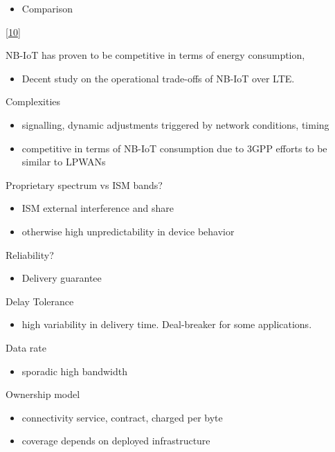 \documentclass[]{article}
\providecommand{\tightlist}{%
  \setlength{\itemsep}{0pt}\setlength{\parskip}{0pt}}
\begin{document}
\begin{itemize}
\tightlist
\item
  Comparison
\end{itemize}

{[}\protect\hyperlink{ref-Martinez2019}{10}{]}

NB-IoT has proven to be competitive in terms of energy consumption,

\begin{itemize}
\tightlist
\item
  Decent study on the operational trade-offs of NB-IoT over LTE.
\end{itemize}

Complexities

\begin{itemize}
\tightlist
\item
  signalling, dynamic adjustments triggered by network conditions,
  timing
\item
  competitive in terms of NB-IoT consumption due to 3GPP efforts to be
  similar to LPWANs
\end{itemize}

Proprietary spectrum vs ISM bands?

\begin{itemize}
\tightlist
\item
  ISM external interference and share
\item
  otherwise high unpredictability in device behavior
\end{itemize}

Reliability?

\begin{itemize}
\tightlist
\item
  Delivery guarantee
\end{itemize}

Delay Tolerance

\begin{itemize}
\tightlist
\item
  high variability in delivery time. Deal-breaker for some applications.
\end{itemize}

Data rate

\begin{itemize}
\tightlist
\item
  sporadic high bandwidth
\end{itemize}

Ownership model

\begin{itemize}
\tightlist
\item
  connectivity service, contract, charged per byte
\item
  coverage depends on deployed infrastructure
\end{itemize}
\end{document}
